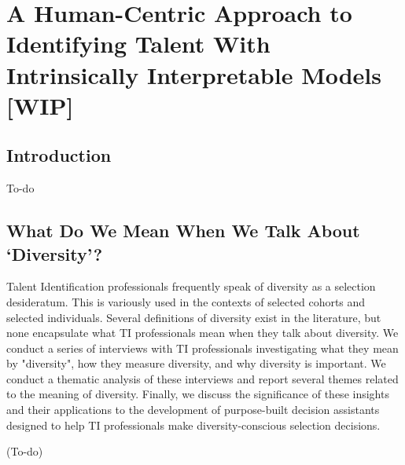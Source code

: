 

\chapter{\label{ch:iaicasestudy}A Human-Centric Approach to Identifying Talent With Intrinsically Interpretable Models [WIP]} %

\minitoc

\section{Introduction}
To-do

\section{What Do We Mean When We Talk About `Diversity'?}
Talent Identification professionals frequently speak of diversity as a selection desideratum. This is variously used in the contexts of selected cohorts and selected individuals. Several definitions of diversity exist in the literature, but none encapsulate what TI professionals mean when they talk about diversity. We conduct a series of interviews with TI professionals investigating what they mean by "diversity", how they measure diversity, and why diversity is important. We conduct a thematic analysis of these interviews and report several themes related to the meaning of diversity. Finally, we discuss the significance of these insights and their applications to the development of purpose-built decision assistants designed to help TI professionals make diversity-conscious selection decisions.

(To-do)

